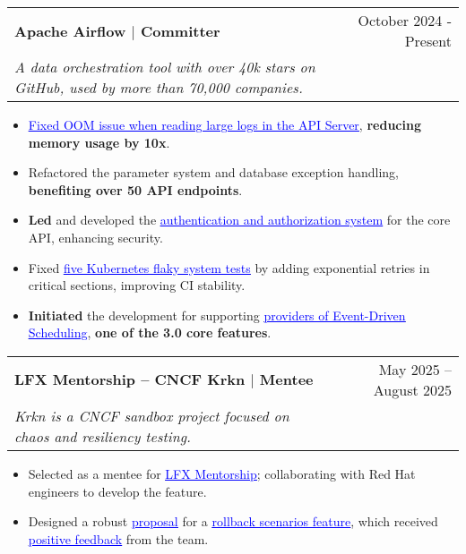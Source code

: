 \documentclass[letterpaper,11pt]{article}
\makeatletter
\newcommand{\resumeItem}[1]{
  \item\small{
    {#1 \vspace{-2pt}}
  }
}
\newcommand{\resumeSubheading}[4]{
  \vspace{-2pt}\item
    \begin{tabular*}{0.97\textwidth}[t]{l@{\extracolsep{\fill}}r}
      \textbf{#1} & #2 \\
      \textit{\small#3} & \textit{\small #4} \\
    \end{tabular*}\vspace{-7pt}
}
\newcommand{\resumeItemListStart}{\begin{itemize}}
\newcommand{\resumeItemListEnd}{\end{itemize}\vspace{-5pt}}
\makeatother
\begin{document}
    \resumeSubheading
      {Apache Airflow $|$ Committer}{October 2024 - Present}
      {A data orchestration tool with over 40k stars on GitHub, used by more than 70,000 companies.}{}
      \resumeItemListStart
        \resumeItem{\href{https://github.com/apache/airflow/pull/49470}{\textcolor{blue}{\underline{Fixed OOM issue when reading large logs in the API Server}}}, \textbf{reducing memory usage by 10x}.}
        \resumeItem{Refactored the parameter system and database exception handling, \textbf{benefiting over 50 API endpoints}.}
        \resumeItem{\textbf{Led} and developed the \href{https://github.com/apache/airflow/issues/42360}{\textcolor{blue}{\underline{authentication and authorization system}}} for the core API, enhancing security.}
        \resumeItem{Fixed \href{https://github.com/apache/airflow/pulls?q=\%3Apr+author\%3Ajason810496+is\%3Amerged+Fix+k8s+}{\textcolor{blue}{\underline{five Kubernetes flaky system tests}}} by adding exponential retries in critical sections, improving CI stability.}
        \resumeItem{\textbf{Initiated} the development for supporting \href{https://github.com/apache/airflow/issues/52712}{\textcolor{blue}{\underline{providers of Event-Driven Scheduling}}}, \textbf{one of the 3.0 core features}.}
      \resumeItemListEnd

    \resumeSubheading
      {LFX Mentorship – CNCF Krkn $|$ Mentee}{May 2025 – August 2025}
      {Krkn is a CNCF sandbox project focused on chaos and resiliency testing.}{}
      \resumeItemListStart
        \resumeItem{Selected as a mentee for \href{https://mentorship.lfx.linuxfoundation.org/project/92e42a9c-fc0a-46bf-8ca7-69ad673dcce0}{\textcolor{blue}{\underline{LFX Mentorship}}}; collaborating with Red Hat engineers to develop the feature.}
        \resumeItem{Designed a robust \href{https://docs.google.com/document/d/11KwSi\_c\_WkkD6I2jbBEMQR-GEjIqOVVu0fviBVQ-9cQ}{\textcolor{blue}{\underline{proposal}}} for a \href{https://github.com/cncf/mentoring/blob/main/programs/lfx-mentorship/2025/02-Jun-Aug/README.md\#chaos-scenario-rollback-feature}{\textcolor{blue}{\underline{rollback scenarios feature}}}, which received \href{https://www.linkedin.com/posts/activity-7368293254267551746-xlVd?utm_source=share&utm_medium=member_desktop\&rcm=ACoAADypogYB37Bb3cfyiwt5RnsZYRtLPFnOo-k}{\textcolor{blue}{\underline{positive feedback}}} from the team.}
      \resumeItemListEnd
\end{document}
